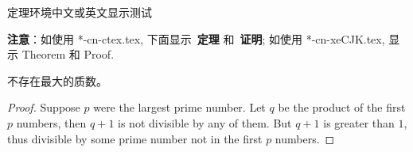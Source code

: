 \begin{frame}{定理环境中文或英文显示测试}

{\bf 注意}：如使用 *-cn-ctex.tex, 下面显示~{\bf 定理} 和~{\bf 证明};
如使用 *-cn-xeCJK.tex, 显示 Theorem 和 Proof.

\begin{theorem}
    不存在最大的质数。
\end{theorem}

\begin{proof}
    Suppose $p$ were the largest prime number.
    Let $q$ be the product of the first $p$ numbers, then $q + 1$ is not
    divisible by any of them.
    But $q + 1$ is greater than $1$, thus divisible by some prime number
    not in the first $p$ numbers.\qedhere
\end{proof}
\end{frame}
